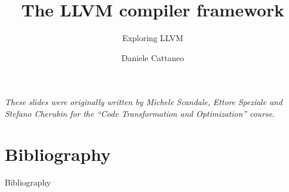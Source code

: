 

\author{Daniele Cattaneo}
\date{\DATE}
\title{The LLVM compiler framework}
\subtitle{Exploring LLVM}
\newcommand{\customdata}{Daniele Cattaneo <daniele.cattaneo@polimi.it>}





\begin{frame}
\maketitle
\begin{center}
\itshape\scriptsize
These slides were originally written by
Michele Scandale, Ettore Speziale and Stefano Cherubin for the
``Code Transformation and Optimization'' course.
\end{center}
\end{frame}








\section{Bibliography}
\begin{frame}[allowframebreaks]{Bibliography}
\nocite{*}


\end{frame}

